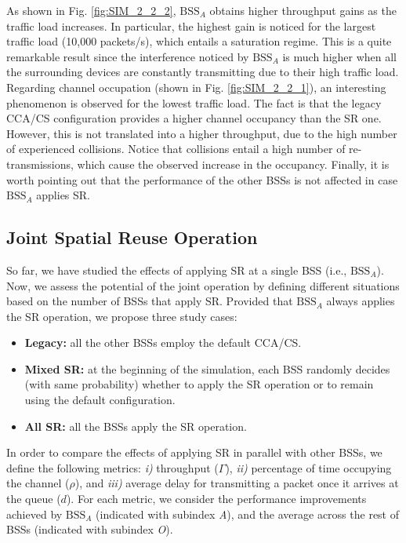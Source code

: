 \documentclass{article}
\begin{document}
As shown in Fig. \ref{fig:SIM_2_2_2}, $\text{BSS}_A$ obtains higher throughput gains as the traffic load increases. In particular, the highest gain is noticed for the largest traffic load (10,000 packets/s), which entails a saturation regime. This is a quite remarkable result since the interference noticed by $\text{BSS}_A$ is much higher when all the surrounding devices are constantly transmitting due to their high traffic load. Regarding channel occupation (shown in Fig. \ref{fig:SIM_2_2_1}), an interesting phenomenon is observed for the lowest traffic load. The fact is that the legacy CCA/CS configuration provides a higher channel occupancy than the SR one. However, this is not translated into a higher throughput, due to the high number of experienced collisions. Notice that collisions entail a high number of re-transmissions, which cause the observed increase in the occupancy. Finally, it is worth pointing out that the performance of the other BSSs is not affected in case $\text{BSS}_A$ applies SR.

\subsection{Joint Spatial Reuse Operation}
\label{section:random_scenarios_collaborative}
So far, we have studied the effects of applying SR at a single BSS (i.e., $\text{BSS}_A$). Now, we assess the potential of the joint operation by defining different situations based on the number of BSSs that apply SR. Provided that $\text{BSS}_A$ always applies the SR operation, we propose three study cases: 
\begin{itemize}
	\item \textbf{Legacy:} all the other BSSs employ the default CCA/CS.
	\item \textbf{Mixed SR:} at the beginning of the simulation, each BSS randomly decides (with same probability) whether to apply the SR operation or to remain using the default configuration.
	\item \textbf{All SR:} all the BSSs apply the SR operation. 
\end{itemize}

In order to compare the effects of applying SR in parallel with other BSSs, we define the following metrics: \emph{i)} throughput ($\Gamma$), \emph{ii)} percentage of time occupying the channel ($\rho$), and \emph{iii)} average delay for transmitting a packet once it arrives at the queue ($d$). For each metric, we consider the performance improvements achieved by $\text{BSS}_A$ (indicated with subindex \emph{A}), and the average across the rest of BSSs (indicated with subindex \emph{O}).
\end{document}
